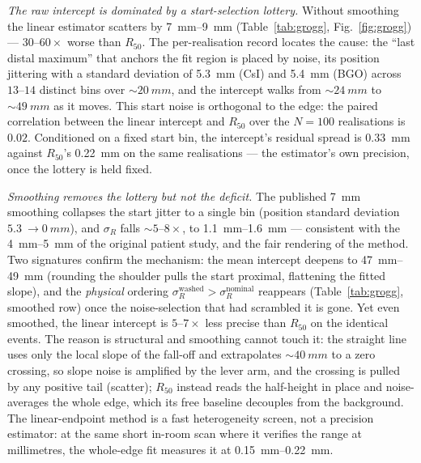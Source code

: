 \documentclass[11pt]{article}
\newcommand{\Rfifty}{R_{50}}
\begin{document}
\emph{The raw intercept is dominated by a start-selection lottery.} Without
smoothing the linear estimator scatters by \SIrange{7}{9}{mm}
(Table~\ref{tab:grogg}, Fig.~\ref{fig:grogg}) --- $30$--$60\times$ worse than
$\Rfifty$. The
per-realisation record locates the cause: the ``last distal maximum'' that
anchors the fit region is placed by noise, its position jittering with a
standard deviation of \SI{5.3}{mm} (CsI) and \SI{5.4}{mm} (BGO) across
$13$--$14$ distinct bins over $\sim\!\SI{20}{mm}$, and the intercept walks from
$\sim\!\SI{24}{mm}$ to $\sim\!\SI{49}{mm}$ as it moves. This start noise is
orthogonal to the edge: the paired correlation between the linear intercept and
$\Rfifty$ over the $N=100$ realisations is $0.02$. Conditioned on a fixed start
bin, the intercept's residual spread is \SI{0.33}{mm} against $\Rfifty$'s
\SI{0.22}{mm} on the same realisations --- the estimator's own precision, once
the lottery is held fixed.

\emph{Smoothing removes the lottery but not the deficit.} The published
\SI{7}{mm} smoothing collapses the start jitter to a single bin (position
standard deviation $\SI{5.3}{}\to\SI{0}{mm}$), and $\sigma_R$ falls
$\sim\!5$--$8\times$, to \SIrange{1.1}{1.6}{mm} --- consistent with the
\SIrange{4}{5}{mm} of the original patient study, and the fair rendering of the
method. Two signatures confirm the mechanism: the mean intercept deepens to
\SIrange{47}{49}{mm} (rounding the shoulder pulls the start proximal, flattening
the fitted slope), and the \emph{physical} ordering $\sigma_R^{\text{washed}} >
\sigma_R^{\text{nominal}}$ reappears (Table~\ref{tab:grogg}, smoothed row) once
the noise-selection that had scrambled it is gone. Yet even smoothed, the linear
intercept is $5$--$7\times$ less precise than $\Rfifty$ on the identical events.
The reason is structural and smoothing cannot touch it: the straight line uses
only the local slope of the fall-off and extrapolates $\sim\!\SI{40}{mm}$ to a
zero crossing, so slope noise is amplified by the lever arm, and the crossing is
pulled by any positive tail (scatter); $\Rfifty$ instead reads the half-height
in place and noise-averages the whole edge, which its free baseline decouples
from the background. The linear-endpoint method is a fast heterogeneity screen,
not a precision estimator: at the same short in-room scan where it verifies the
range at millimetres, the whole-edge fit measures it at
\SIrange{0.15}{0.22}{mm}.
\end{document}
